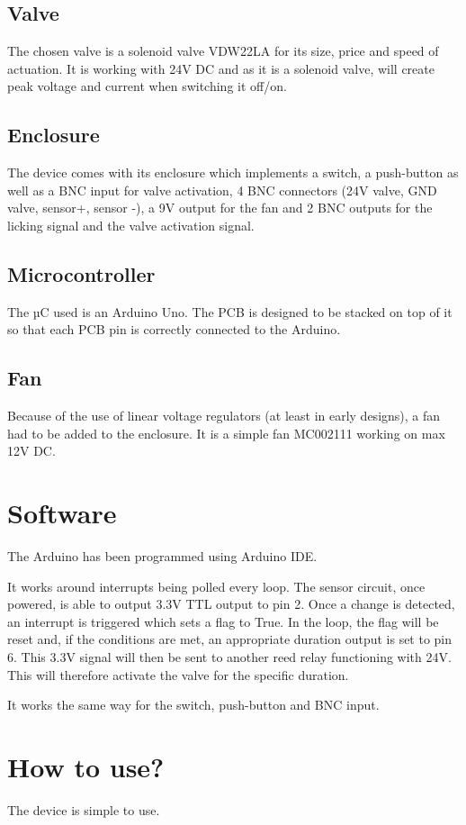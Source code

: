 \documentclass[a4paper]{article}
\begin{document}
\subsection{Valve}
The chosen valve is a solenoid valve VDW22LA for its size, price and speed of actuation. It is working with 24V DC and as it is a solenoid valve, will create peak voltage and current when switching it off/on.
\subsection{Enclosure}
The device comes with its enclosure which implements a switch, a push-button as well as a BNC input for valve activation, 4 BNC connectors (24V valve, GND valve, sensor+, sensor -), a 9V output for the fan and 2 BNC outputs for the licking signal and the valve activation signal.

\subsection{Microcontroller}
The µC used is an Arduino Uno. The PCB is designed to be stacked on top of it so that each PCB pin is correctly connected to the Arduino. 

\subsection{Fan}
Because of the use of linear voltage regulators (at least in early designs), a fan had to be added to the enclosure. It is a simple fan MC002111 working on max 12V DC.

\section{Software}
The Arduino has been programmed using Arduino IDE. 

It works around interrupts being polled every loop.
The sensor circuit, once powered, is able to output 3.3V TTL output to pin 2. Once a change is detected, an interrupt is triggered which sets a flag to True. In the loop, the flag will be reset and, if the conditions are met, an appropriate duration output is set to pin 6. This 3.3V signal will then be sent to another reed relay functioning with 24V. This will therefore activate the valve for the specific duration.

It works the same way for the switch, push-button and BNC input.

\section{How to use?}
The device is simple to use.
\end{document}
